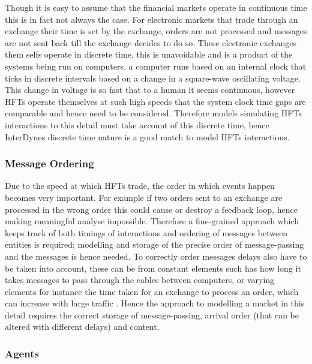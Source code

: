 \documentclass{article}
\begin{document}
Though it is easy to assume that the financial markets operate in continuous time this is in fact not always the case. For electronic markets that trade through an exchange their time is set by the exchange, orders are not processed and messages are not sent back till the exchange decides to do so. These electronic exchanges them selfs operate in discrete time, this is unavoidable and is a product of the systems being run on computers, a computer runs based on an internal clock that ticks in discrete intervals based on a change in a square-wave oscillating voltage. This change in voltage is so fast that to a human it seems continuous, however HFTs operate themselves at such high speeds that the system clock time gaps are comparable and hence need to be considered. Therefore models simulating HFTs interactions to this detail must take account of this discrete time, hence InterDynes discrete time nature is a good match to model HFTs interactions.     
     

\subsubsection{Message Ordering}

Due to the speed at which HFTs trade, the order in which events happen becomes very important. For example if two orders sent to an exchange are processed in the wrong order this could cause or destroy a feedback loop, hence making meaningful analyse impossible. Therefore a fine-grained approach which keeps track of both timings of interactions and ordering of messages between entities is required; modelling and storage of the precise order of message-passing and the messages is hence needed. To correctly order messages delays also have to be taken into account, these can be from constant elements such has how long it takes messages to pass through the cables between computers, or varying elements for instance the time taken for an exchange to process an order, which can increase with large traffic \cite{SECreport_delays}. Hence the approach to modelling a market in this detail requires the correct storage of message-passing, arrival order (that can be altered with different delays) and content.


\subsubsection{Agents}


\end{document}
